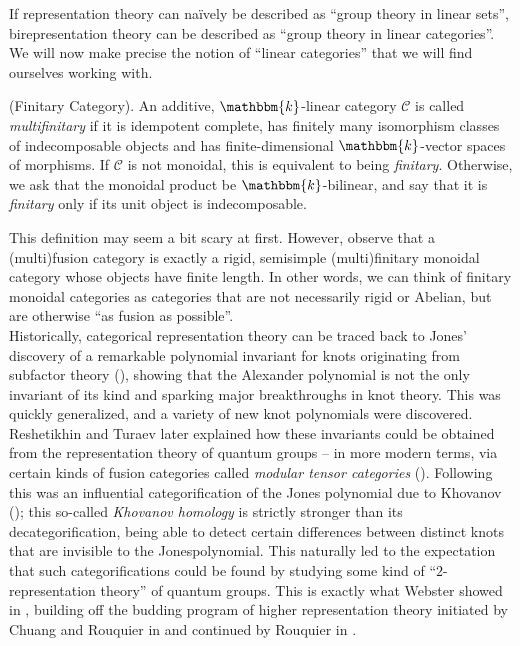 
\noindent If representation theory can na\"{i}vely be described as ``group theory in linear sets'', birepresentation theory can be described as ``group theory in linear categories''. We will now make precise the notion of ``linear categories'' that we will find ourselves working with.\\

\noindent\begin{definition}\textup{(Finitary Category).} An additive, $\mathbbm{k}$-linear category $\mathcal{C}$ is called {\em multifinitary} if it is idempotent complete, has finitely many isomorphism classes of indecomposable objects and has finite-dimensional $\mathbbm{k}$-vector spaces of morphisms. If $\mathcal{C}$ is not monoidal, this is equivalent to being {\em finitary}. Otherwise, we ask that the monoidal product be $\mathbbm{k}$-bilinear, and say that it is {\em finitary} only if its unit object is indecomposable.\\
\end{definition}

\noindent This definition may seem a bit scary at first. However, observe that a (multi)fusion category is exactly a rigid, semisimple (multi)finitary monoidal category whose objects have finite length. In other words, we can think of finitary monoidal categories as categories that are not necessarily rigid or Abelian, but are otherwise ``as fusion as possible''.\\

\noindent Historically, categorical representation theory can be traced back to Jones' discovery of a remarkable polynomial invariant for knots originating from subfactor theory (\cite{Jon85}), showing that the Alexander polynomial is not the only invariant of its kind and sparking major breakthroughs in knot theory. This was quickly generalized, and a variety of new knot polynomials were discovered. Reshetikhin and Turaev later explained how these invariants could be obtained from the representation theory of quantum groups -- in more modern terms, via certain kinds of fusion categories called {\em modular tensor categories} (\cite{RT91}). Following this was an influential categorification of the Jones polynomial due to Khovanov (\cite{Kho00}); this so-called {\em Khovanov homology} is strictly stronger than its decategorification, being able to detect certain differences between distinct knots that are invisible to the Jones\linebreak polynomial. This naturally led to the expectation that such categorifications could be found by studying some kind of ``$2$-representation theory'' of quantum groups. This is exactly what Webster showed in \cite{Web17}, building off the budding program of higher representation theory initiated by Chuang and Rouquier in \cite{CR08} and continued by Rouquier in \cite{Rou08}.\\

